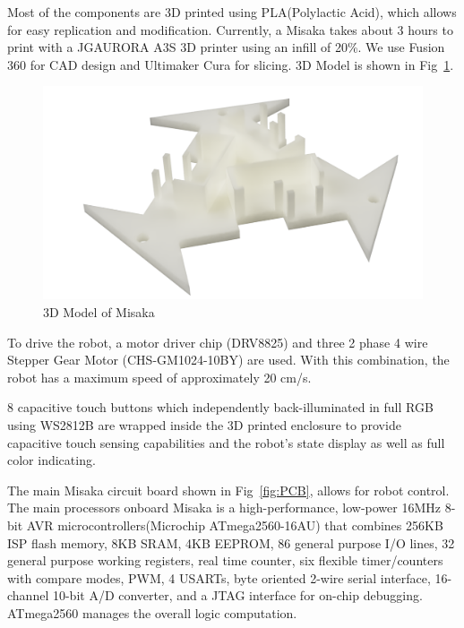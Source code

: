 \documentclass[conference]{IEEEtran}
\begin{document}
Most of the components are 3D printed using PLA(Polylactic Acid), which allows for easy replication and modification. Currently, a Misaka takes about 3 hours to print with a JGAURORA A3S 3D printer using an infill of 20\%. We use Fusion 360 for CAD design and Ultimaker Cura for slicing. 3D Model is shown in Fig~\ref{fig:3DModel}.

\begin{figure}[htbp]
    \centering
    \includegraphics[width=\columnwidth]{3DModel.png}
    \caption{3D Model of Misaka}
    \label{fig:3DModel}
\end{figure}

To drive the robot, a motor driver chip (DRV8825) and three 2 phase 4 wire Stepper Gear Motor (CHS-GM1024-10BY) are used. With this combination, the robot has a maximum speed of approximately 20 cm/s.

8 capacitive touch buttons which independently back-illuminated in full RGB using WS2812B are wrapped inside the 3D printed enclosure to provide capacitive touch sensing capabilities and the robot’s state display as well as full color indicating.

The main Misaka circuit board shown in Fig~\ref{fig:PCB}, allows for robot control. The main processors onboard Misaka is a high-performance, low-power 16MHz 8-bit AVR microcontrollers(Microchip ATmega2560-16AU) that combines 256KB ISP flash memory, 8KB SRAM, 4KB EEPROM, 86 general purpose I/O lines, 32 general purpose working registers, real time counter, six flexible timer/counters with compare modes, PWM, 4 USARTs, byte oriented 2-wire serial interface, 16-channel 10-bit A/D converter, and a JTAG interface for on-chip debugging. ATmega2560 manages the overall logic computation.
\end{document}

